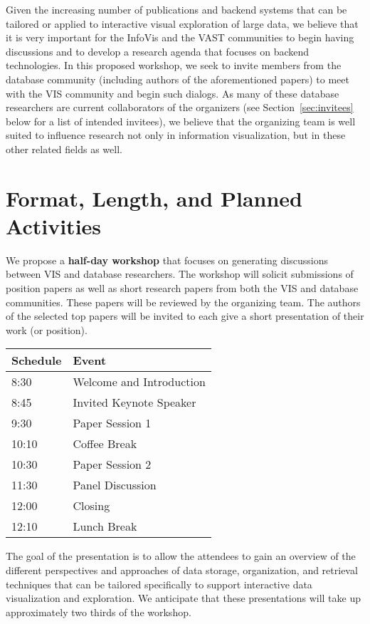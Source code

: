 \documentclass[journal]{vgtc}                %
\begin{document}
Given the increasing number of publications and backend systems that can be tailored or applied to interactive visual exploration of large data, we believe that it is very important for the InfoVis and the
VAST communities to begin having discussions and to develop a research agenda that focuses on backend technologies. 
In this proposed workshop, we seek to invite members from the database community (including authors of the aforementioned papers) to meet with the VIS community and begin such dialogs. 
As many of these database researchers are current collaborators of the organizers (see Section~\ref{sec:invitees} below for a list of intended invitees), we believe that the organizing team is well suited to influence research not only in information visualization, but in these other related fields as well.

\section{Format, Length, and Planned Activities}
We propose a \textbf{half-day workshop} that focuses on generating discussions between VIS and database researchers. 
The workshop will solicit submissions of position papers as well as short research papers from both the VIS and database communities. 
These papers will be reviewed by the organizing team. 
The authors of the selected top papers will be invited to each give a short presentation of their work (or position).

\begin{center}
\begin{tabular}{ l l } 
 \hline
 Schedule & Event \\ 
 \hline
 8:30  & Welcome and Introduction\\ 
 8:45 & Invited Keynote Speaker\\ 
 9:30 & Paper Session 1\\ 
 10:10 & Coffee Break \\ 
 10:30  & Paper Session 2\\ 
 11:30  & Panel Discussion\\ 
 12:00 & Closing\\
 12:10 & Lunch Break\\
 \hline
\end{tabular}
\end{center}

The goal of the presentation is to allow the attendees to gain an overview of the different perspectives and approaches of data storage, organization, and retrieval techniques that can be tailored specifically to support interactive data visualization and exploration. 
We anticipate that these presentations will take up approximately two thirds of the workshop.
\end{document}
